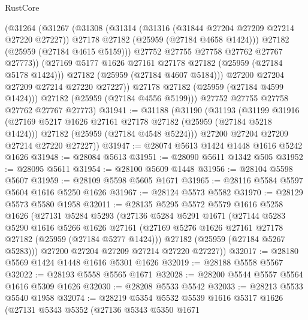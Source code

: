 \begin{lexlean}{RustCore}
\begin{coremodule}
                (@31264
                  (@31267
                    (@31308
                      (@31314
                        (@31316 (@31844 @27204 @27209 @27214 @27220 @27227))
                        @27178
                        @27182
                        (@25959 (@27184 @4658 @1424)))
                      @27182
                      (@25959 (@27184 @4615 @5159)))
                    @27752
                    @27755
                    @27758
                    @27762
                    @27767
                    @27773))
                (@27169 @5177 @1626 @27161 @27178 @27182 (@25959 (@27184 @5178 @1424)))
                @27182
                (@25959 (@27184 @4607 @5184)))
              @27200
              @27204
              @27209
              @27214
              @27220
              @27227))
          @27178
          @27182
          (@25959 (@27184 @4599 @1424)))
        @27182
        (@25959 (@27184 @4556 @5199)))
      @27752
      @27755
      @27758
      @27762
      @27767
      @27773)
@31941 := @31188
    (@31190
      (@31193
        (@31199
          @31916
          (@27169 @5217 @1626 @27161 @27178 @27182 (@25959 (@27184 @5218 @1424)))
          @27182
          (@25959 (@27184 @4548 @5224)))
        @27200
        @27204
        @27209
        @27214
        @27220
        @27227))
@31947 := @28074 @5613 @1424 @1448 @1616 @5242 @1626
@31948 := @28084 @5613
@31951 := @28090 @5611 @1342 @505
@31952 := @28095 @5611
@31954 := @28100 @5609 @1448
@31956 := @28104 @5598 @5607
@31959 := @28109 @5598 @5605 @1671
@31965 := @28116 @5584 @5597 @5604 @1616 @5250 @1626
@31967 := @28124 @5573 @5582
@31970 := @28129 @5573 @5580 @1958
@32011 := @28135
    @5295
    @5572
    @5579
    @1616
    @5258
    @1626
    (@27131
      @5284
      @5293
      (@27136
        @5284
        @5291
        @1671
        (@27144
          @5283
          @5290
          @1616
          @5266
          @1626
          @27161
          (@27169 @5276 @1626 @27161 @27178 @27182 (@25959 (@27184 @5277 @1424)))
          @27182
          (@25959 (@27184 @5267 @5283)))
        @27200
        @27204
        @27209
        @27214
        @27220
        @27227))
@32017 := @28180 @5569 @1424 @1448 @1616 @5301 @1626
@32019 := @28188 @5558 @5567
@32022 := @28193 @5558 @5565 @1671
@32028 := @28200 @5544 @5557 @5564 @1616 @5309 @1626
@32030 := @28208 @5533 @5542
@32033 := @28213 @5533 @5540 @1958
@32074 := @28219
    @5354
    @5532
    @5539
    @1616
    @5317
    @1626
    (@27131
      @5343
      @5352
      (@27136
        @5343
        @5350
        @1671

\end{coremodule}
\end{lexlean}
